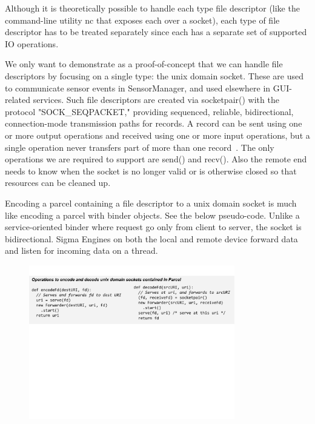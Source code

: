 \documentclass[prodmode]{acmlarge}
\begin{document}
Although it is theoretically possible to handle each type file descriptor (like the command-line utility nc that exposes each over a socket), each type of file descriptor has to be treated separately since each has a separate set of supported IO operations.

We only want to demonstrate as a proof-of-concept that we can handle file descriptors by focusing on a single type: the unix domain socket. These are used to communicate sensor events in SensorManager, and used elsewhere in GUI-related services. Such file descriptors are created via socketpair() with the protocol "SOCK\_SEQPACKET," providing sequenced, reliable, bidirectional, connection-mode transmission paths for records. A record can be sent using one or more output operations and received using one or more input operations, but a single operation never transfers part of more than one record~\cite{SocketManPage}. The only operations we are required to support are send() and recv(). Also the remote end needs to know when the socket is no longer valid or is otherwise closed so that resources can be cleaned up.

Encoding a parcel containing a file descriptor to a unix domain socket is much like encoding a parcel with binder objects. See the below pseudo-code. Unlike a service-oriented binder where request go only from client to server, the socket is bidirectional. Sigma Engines on both the local and remote device forward data and listen for incoming data on a thread.
\begin{figure}[h]
\centering
\includegraphics[width=0.8\textwidth]{drawings/encodeFds.pdf}
\end{figure}
\end{document}
